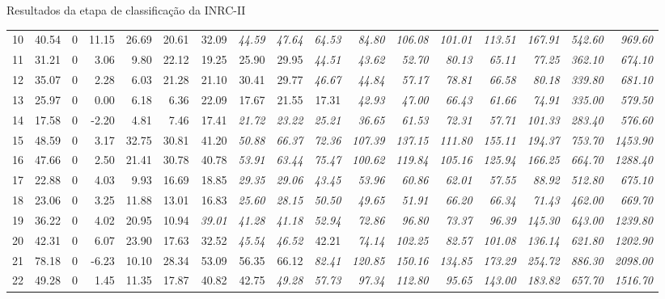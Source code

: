 \documentclass[8pt,mathserif,professionalfont]{beamer}
\begin{document}
\begin{frame}{Resultados da etapa de classificação da INRC-II}
\begin{table}[H]
{\begin{tabular}{lrrrrrrrrrrrrrrrr}
   10 & 40.54 &   0 & 11.15 & 26.69 & 20.61 & 32.09 & \it 44.59 & \it 47.64 & \it 64.53 & \it 84.80 & \it 106.08 & \it 101.01 & \it 113.51 & \it 167.91 & \it 542.60 & \it 969.60 \\
   11 & 31.21 &   0 & 3.06 & 9.80 & 22.12 & 19.25 & 25.90 & 29.95 & \it 44.51 & \it 43.62 & \it 52.70 & \it 80.13 & \it 65.11 & \it 77.25 & \it 362.10 & \it 674.10 \\
   12 & 35.07 &   0 & 2.28 & 6.03 & 21.28 & 21.10 & 30.41 & 29.77 & \it 46.67 & \it 44.84 & \it 57.17 & \it 78.81 & \it 66.58 & \it 80.18 & \it 339.80 & \it 681.10 \\
   13 & 25.97 &   0 & 0.00 & 6.18 & 6.36 & 22.09 & 17.67 & 21.55 & 17.31 & \it 42.93 & \it 47.00 & \it 66.43 & \it 61.66 & \it 74.91 & \it 335.00 & \it 579.50 \\
   14 & 17.58 &   0 & -2.20 & 4.81 & 7.46 & 17.41 & \it 21.72 & \it 23.22 & \it 25.21 & \it 36.65 & \it 61.53 & \it 72.31 & \it 57.71 & \it 101.33 & \it 283.40 & \it 576.60 \\
   15 & 48.59 &   0 & 3.17 & 32.75 & 30.81 & 41.20 & \it 50.88 & \it 66.37 & \it 72.36 & \it 107.39 & \it 137.15 & \it 111.80 & \it 155.11 & \it 194.37 & \it 753.70 & \it 1453.90 \\
   16 & 47.66 &   0 & 2.50 & 21.41 & 30.78 & 40.78 & \it 53.91 & \it 63.44 & \it 75.47 & \it 100.62 & \it 119.84 & \it 105.16 & \it 125.94 & \it 166.25 & \it 664.70 & \it 1288.40 \\
   17 & 22.88 &   0 & 4.03 & 9.93 & 16.69 & 18.85 & \it 29.35 & \it 29.06 & \it 43.45 & \it 53.96 & \it 60.86 & \it 62.01 & \it 57.55 & \it 88.92 & \it 512.80 & \it 675.10 \\
   18 & 23.06 &   0 & 3.25 & 11.88 & 13.01 & 16.83 & \it 25.60 & \it 28.15 & \it 50.50 & \it 49.65 & \it 51.91 & \it 66.20 & \it 66.34 & \it 71.43 & \it 462.00 & \it 669.70 \\
   19 & 36.22 &   0 & 4.02 & 20.95 & 10.94 & \it 39.01 & \it 41.28 & \it 41.18 & \it 52.94 & \it 72.86 & \it 96.80 & \it 73.37 & \it 96.39 & \it 145.30 & \it 643.00 & \it 1239.80 \\
   20 & 42.31 &   0 & 6.07 & 23.90 & 17.63 & 32.52 & \it 45.54 & \it 46.52 & 42.21 & \it 74.14 & \it 102.25 & \it 82.57 & \it 101.08 & \it 136.14 & \it 621.80 & \it 1202.90 \\
   21 & 78.18 &   0 & -6.23 & 10.10 & 28.34 & 53.09 & 56.35 & 66.12 & \it 82.41 & \it 120.85 & \it 150.16 & \it 134.85 & \it 173.29 & \it 254.72 & \it 886.30 & \it 2098.00 \\
   22 & 49.28 &   0 & 1.45 & 11.35 & 17.87 & 40.82 & 42.75 & \it 49.28 & \it 57.73 & \it 97.34 & \it 112.80 & \it 95.65 & \it 143.00 & \it 183.82 & \it 657.70 & \it 1516.70 \\

\end{tabular}}
\end{table}
\end{frame}
\end{document}
